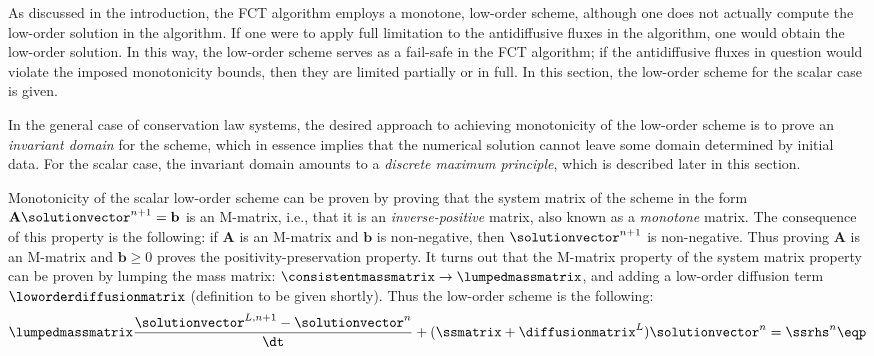 As discussed in the introduction, the FCT algorithm employs a monotone,
low-order scheme, although one does not actually compute the low-order
solution in the algorithm. If one were to apply full limitation to
the antidiffusive fluxes in the algorithm, one would obtain the low-order
solution. In this way, the low-order scheme serves as a fail-safe in the FCT
algorithm; if the antidiffusive fluxes in question would violate the imposed
monotonicity bounds, then they are limited partially or in full. In this section,
the low-order scheme for the scalar case is given.

In the general case of conservation law systems, the desired approach to
achieving monotonicity of the low-order scheme is to prove an \emph{invariant
domain} for the scheme, which in essence implies that the numerical
solution cannot leave some domain determined by initial data. For the
scalar case, the invariant domain amounts to a \emph{discrete maximum principle},
which is described later in this section.

Monotonicity of the scalar low-order
scheme can be proven by proving that the system matrix of the scheme in
the form $\mathbf{A}\solutionvector^{n+1}=\mathbf{b}$ is an M-matrix, i.e.,
that it is an \emph{inverse-positive} matrix, also known as a \emph{monotone}
matrix. The consequence of this property
is the following: if $\mathbf{A}$ is an M-matrix and $\mathbf{b}$ is
non-negative, then $\solutionvector^{n+1}$ is non-negative. Thus proving
$\mathbf{A}$ is an M-matrix and $\mathbf{b}\geq 0$ proves the
positivity-preservation property. It turns out that the M-matrix
property of the system matrix property can be proven by
lumping the mass matrix:
$\consistentmassmatrix\rightarrow\lumpedmassmatrix$,
and adding a low-order diffusion term
$\loworderdiffusionmatrix$ (definition to be given shortly).
Thus the low-order scheme is the following:
\begin{equation}
  \lumpedmassmatrix\frac{\solutionvector^{L,n+1}-\solutionvector^n}{\dt}
    + (\ssmatrix + \diffusionmatrix^L)\solutionvector^n = \ssrhs^n \eqp
\end{equation}

